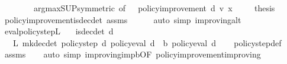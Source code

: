 \begin{isabellebody}
\ \ \ \ \ \ \ \ arg{\isacharunderscore}{\kern0pt}max{\isacharunderscore}{\kern0pt}SUP{\isacharbrackleft}{\kern0pt}symmetric{\isacharcomma}{\kern0pt}\ of\ {\isacharunderscore}{\kern0pt}\ {\isacharunderscore}{\kern0pt}\ {\isachardoublequoteopen}{\isacharparenleft}{\kern0pt}policy{\isacharunderscore}{\kern0pt}improvement\ d\ v\ x{\isacharparenright}{\kern0pt}{\isachardoublequoteclose}{\isacharbrackright}{\kern0pt}\ {\isacharparenright}{\kern0pt}\isanewline
\ \ \isamarkupfalse%
\ {\isacharquery}{\kern0pt}thesis\isanewline
\ \ \ \ \isamarkupfalse%
\ policy{\isacharunderscore}{\kern0pt}improvement{\isacharunderscore}{\kern0pt}is{\isacharunderscore}{\kern0pt}dec{\isacharunderscore}{\kern0pt}det\ assms\isanewline
\ \ \ \ \isamarkupfalse%
\ {\isacharparenleft}{\kern0pt}auto\ simp{\isacharcolon}{\kern0pt}\ {\isasymnu}{\isacharunderscore}{\kern0pt}improving{\isacharunderscore}{\kern0pt}alt{\isacharparenright}{\kern0pt}\isanewline
{}\isamarkupfalse%
%
\endisatagproof
{\isafoldproof}%
%
\isadelimproof
\isanewline
%
\endisadelimproof
\isanewline
{}\isamarkupfalse%
\ eval{\isacharunderscore}{\kern0pt}policy{\isacharunderscore}{\kern0pt}step{\isacharunderscore}{\kern0pt}L{\isacharcolon}{\kern0pt}\isanewline
\ \ \ {\isachardoublequoteopen}is{\isacharunderscore}{\kern0pt}dec{\isacharunderscore}{\kern0pt}det\ d{\isachardoublequoteclose}\isanewline
\ \ \ {\isachardoublequoteopen}L\ {\isacharparenleft}{\kern0pt}mk{\isacharunderscore}{\kern0pt}dec{\isacharunderscore}{\kern0pt}det\ {\isacharparenleft}{\kern0pt}policy{\isacharunderscore}{\kern0pt}step\ d{\isacharparenright}{\kern0pt}{\isacharparenright}{\kern0pt}\ {\isacharparenleft}{\kern0pt}policy{\isacharunderscore}{\kern0pt}eval\ d{\isacharparenright}{\kern0pt}\ {\isacharequal}{\kern0pt}\ {\isasymL}\isactrlsub b\ {\isacharparenleft}{\kern0pt}policy{\isacharunderscore}{\kern0pt}eval\ d{\isacharparenright}{\kern0pt}{\isachardoublequoteclose}\isanewline
%
\isadelimproof
\ \ %
\endisadelimproof
%
\isatagproof
{}\isamarkupfalse%
\ policy{\isacharunderscore}{\kern0pt}step{\isacharunderscore}{\kern0pt}def\isanewline
\ \ \isamarkupfalse%
\ assms\isanewline
\ \ \isamarkupfalse%
\ {\isacharparenleft}{\kern0pt}auto\ simp{\isacharcolon}{\kern0pt}\ {\isasymnu}{\isacharunderscore}{\kern0pt}improving{\isacharunderscore}{\kern0pt}imp{\isacharunderscore}{\kern0pt}{\isasymL}\isactrlsub b{\isacharbrackleft}{\kern0pt}OF\ policy{\isacharunderscore}{\kern0pt}improvement{\isacharunderscore}{\kern0pt}improving{\isacharbrackright}{\kern0pt}{\isacharparenright}{\kern0pt}%

\end{isabellebody}
